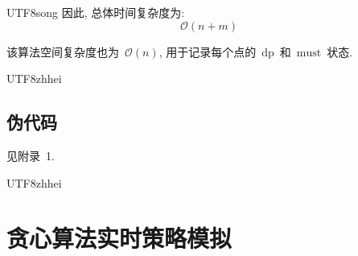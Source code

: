 \documentclass[10.5pt,compsoc]{CjC}
\theoremstyle{mystyle}
\begin{document}
\begin{CJK*}{UTF8}{song}
因此, 总体时间复杂度为: 
\[
\mathcal{O}(n + m)
\]

该算法空间复杂度也为~$\mathcal{O}(n)$,
用于记录每个点的~$\textrm{dp}$~和~$\textrm{must}$~状态.

\begin{CJK*}{UTF8}{zhhei}\subsection{伪代码}\end{CJK*}


见附录~1.

\end{CJK*}


\begin{CJK*}{UTF8}{zhhei}
\vskip 1mm
\section{贪心算法实时策略模拟}
\end{CJK*}
\end{document}

